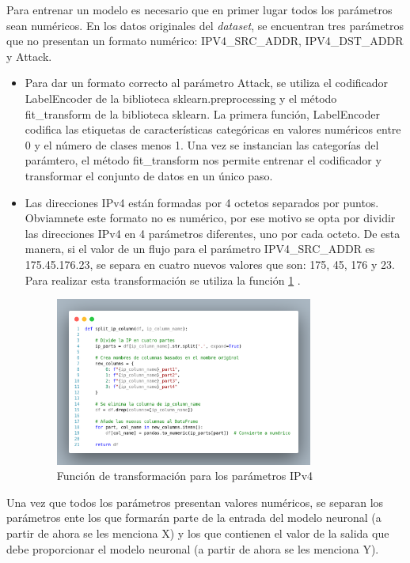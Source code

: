 Para entrenar un modelo es necesario que en primer lugar todos los parámetros sean numéricos. En los datos originales del \textit{dataset}, se encuentran tres parámetros que no presentan un formato numérico: IPV4\_SRC\_ADDR, IPV4\_DST\_ADDR y Attack.

\begin{itemize}
	\item Para dar un formato correcto al parámetro Attack, se utiliza el codificador LabelEncoder de la biblioteca sklearn.preprocessing y el método fit\_transform de la biblioteca sklearn. La primera función, LabelEncoder codifica las etiquetas de características categóricas en valores numéricos entre 0 y el número de clases menos 1. Una vez se instancian las categorías del parámtero, el método fit\_transform nos permite entrenar el codificador y transformar el conjunto de datos en un único paso.
	\item Las direcciones IPv4 están formadas por 4 octetos separados por puntos. Obviamnete este formato no es numérico, por ese motivo se opta por dividir las direcciones IPv4 en 4 parámetros diferentes, uno por cada octeto. De esta manera, si el valor de un flujo para el parámetro IPV4\_SRC\_ADDR es 175.45.176.23, se separa en cuatro nuevos valores que son: 175, 45, 176 y 23. Para realizar esta transformación se utiliza la función \ref{fig:funIPv4} .
\begin{figure}[htbp]
    \centering
    \includegraphics[width=0.8\textwidth]{./img/ent-datos/funIPv4.png}
    \caption{Función de transformación para los parámetros IPv4}
    \label{fig:funIPv4}
\end{figure}

\end{itemize}

Una vez que todos los parámetros presentan valores numéricos, se separan los parámetros ente los que formarán parte de la entrada del modelo neuronal (a partir de ahora se les menciona X) y los que contienen el valor de la salida que debe proporcionar el modelo neuronal (a partir de ahora se les menciona Y).

